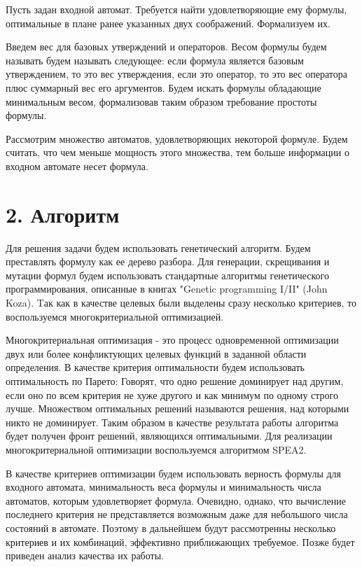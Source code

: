 \documentclass[12pt]{article}
\begin{document}
Пусть задан входной автомат. Требуется найти удовлетворяющие ему формулы, оптимальные в плане ранее указанных
двух соображений. Формализуем их.

Введем вес для базовых утверждений и операторов. Весом формулы будем называть будем называть следующее:
если формула является базовым утверждением, то это вес утверждения, если это оператор, то это вес оператора
плюс суммарный вес его аргументов. Будем искать формулы обладающие минимальным весом, формализовав таким
образом требование простоты формулы.

Рассмотрим множество автоматов, удовлетворяющих некоторой формуле. Будем считать, что чем меньше мощность
этого множества, тем больше информации о входном автомате несет формула.

\section*{2. Алгоритм}

Для решения задачи будем использовать генетический алгоритм. Будем преставлять формулу как ее дерево разбора.
Для генерации, скрещивания и мутации формул будем использовать стандартные алгоритмы генетического программирования,
описанные в книгах "Genetic programming I/II" (John Koza). Tак как в качестве целевых были выделены сразу несколько
критериев, то воспользуемся многокритериальной оптимизацией.

Многокритериальная оптимизация - это процесс одновременной оптимизации двух или более конфликтующих целевых функций
в заданной области определения. В качестве критерия оптимальности будем использовать оптимальность по Парето:
Говорят, что одно решение доминирует над другим, если оно по всем критерия не хуже другого и как минимум по одному
строго лучше. Множеством оптимальных решений называются решения, над которыми никто не доминирует. Таким образом
в качестве результата работы алгоритма будет получен фронт решений, являющихся оптимальными. Для реализации
многокритериальной оптимизации воспользуемся алгоритмом SPEA2.

В качестве критериев оптимизации будем использовать верность формулы для входного автомата, минимальность веса
формулы и минимальность числа автоматов, которым удовлетворяет формула. Очевидно, однако, что вычисление последнего
критерия не представляется возможным даже для небольшого числа состояний в автомате. Поэтому в дальнейшем будут
рассмотренны несколько критериев и их комбинаций, эффективно приближающих требуемое. Позже будет приведен
анализ качества их работы.
\end{document}
